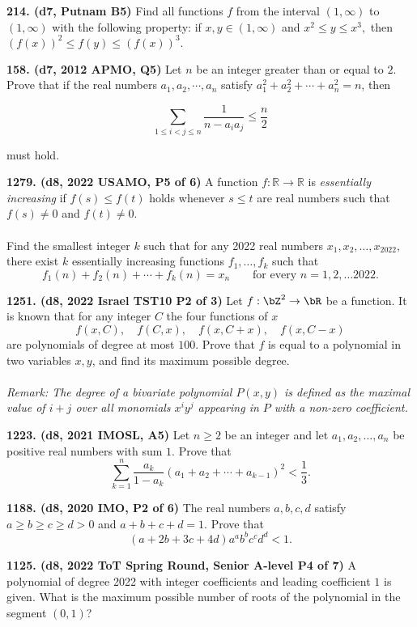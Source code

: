 \documentclass{article}
\begin{document}
\textbf{214. (\color{red}d7\color{black}, Putnam B5)} Find all functions $f$ from the interval $(1,\infty)$ to $(1,\infty)$ with the following property: if $x,y\in(1,\infty)$ and $x^2\le y\le x^3,$ then $(f(x))^2\le f(y) \le (f(x))^3.$

\textbf{158. (\color{red}d7\color{black}, 2012 APMO, Q5)} Let $ n $ be an integer greater than or equal to $ 2 $. Prove that if the real numbers $ a_1 , a_2 , \cdots , a_n $ satisfy $ a_1 ^2 + a_2 ^2 + \cdots + a_n ^ 2 = n $, then

\[\sum_{1 \le i < j \le n} \frac{1}{n- a_i a_j}  \le \frac{n}{2} \]

must hold.

\textbf{1279. (\color{red}d8\color{black}, 2022 USAMO, P5 of 6)} A function $f: \mathbb{R}\to \mathbb{R}$ is \textit{essentially increasing} if $f(s)\leq f(t)$ holds whenever $s\leq t$ are real numbers such that $f(s)\neq 0$ and $f(t)\neq 0$. \\\\ Find the smallest integer $k$ such that for any 2022 real numbers $x_1,x_2,\ldots , x_{2022},$ there exist $k$ essentially increasing functions $f_1,\ldots, f_k$ such that \[ f_1(n) + f_2(n) + \cdots + f_k(n) = x_n\qquad \text{for every } n= 1,2,\ldots 2022. \]

\textbf{1251. (\color{red}d8\color{black}, 2022 Israel TST10 P2 of 3)} Let $f: \bZ^2\to \bR$ be a function.  It is known that for any integer $C$ the four functions of $x$ \[f(x,C), \quad f(C,x),\quad f(x, C+x), \quad f(x,C-x)\] are polynomials of degree at most $100$. Prove that $f$ is equal to a polynomial in two variables $x,y$, and find its maximum possible degree.\\ \\ \textit{Remark: The degree of a bivariate polynomial $P(x,y)$ is defined as the maximal value of $i+j$ over all monomials $x^iy^j$ appearing in $P$ with a non-zero coefficient.}

\textbf{1223. (\color{red}d8\color{black}, 2021 IMOSL, A5)} Let $n\geq 2$ be an integer and let $a_1, a_2, \ldots, a_n$ be positive real numbers with sum $1$. Prove that
\[ \sum_{k=1}^n \frac{a_k}{1-a_k}(a_1+a_2+\cdots+a_{k-1})^2 < \frac{1}{3}. \]

\textbf{1188. (\color{red}d8\color{black}, 2020 IMO, P2 of 6)} The real numbers $a,b,c,d$ satisfy $a\geq b\geq c\geq d>0$ and $a+b+c+d=1$. Prove that \[(a+2b+3c+4d)a^ab^bc^cd^d<1.\]

\textbf{1125. (\color{red}d8\color{black}, 2022 ToT Spring Round, Senior A-level P4 of 7)} A polynomial of degree 2022 with integer coefficients and leading coefficient $1$ is given. What is the maximum possible number of roots of the polynomial in the segment $(0,1)$?
\end{document}
